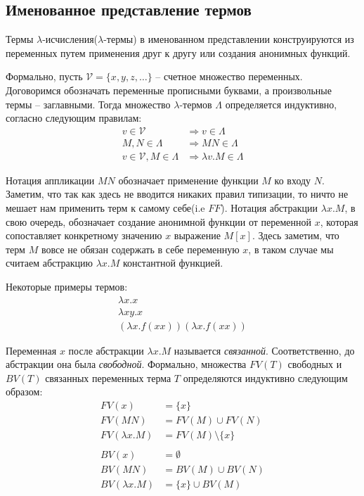 \subsection{Именованное представление термов}
\label{sec:named}

Термы $\lambda$-исчисления($\lambda$-термы) в именованном представлении конструируются из переменных путем применения друг к другу или создания анонимных функций.

Формально, пусть $\mathcal{V}=\{x,y,z,\dots\}$ -- счетное множество переменных. Договоримся обозначать переменные прописными буквами, а произвольные термы -- заглавными. Тогда множество $\lambda$-термов $\Lambda$ определяется индуктивно, согласно следующим правилам:
\begin{align*}
  v \in \mathcal{V} &\Rightarrow v \in \Lambda \\
  M, N \in \Lambda &\Rightarrow M N \in \Lambda \\
  v \in \mathcal{V}, M \in \Lambda &\Rightarrow \lambda v.M \in \Lambda
\end{align*}

Нотация аппликации $M N$ обозначает применение функции $M$ ко входу $N$. Заметим, что так как здесь не вводится никаких правил типизации, то ничто не мешает нам применить терм к самому себе(i.e $F F$). Нотация абстракции $\lambda x.M$, в свою очередь, обозначает создание анонимной функции от переменной $x$, которая сопоставляет конкретному значению $x$ выражение $M[x]$. Здесь заметим, что терм $M$ вовсе не обязан содержать в себе переменную $x$, в таком случае мы считаем абстракцию $\lambda x.M$ константной функцией.

Некоторые примеры термов:
\begin{gather*}
   \lambda x.x \\
   \lambda x y.x \\
   (\lambda x.f (x x)) (\lambda x.f (x x))
\end{gather*}

Переменная $x$ после абстракции $\lambda x.M$ называется \textit{связанной}. Соответственно, до абстракции она была \textit{свободной}. Формально, множества $FV(T)$ свободных и $BV(T)$ связанных переменных терма $T$ определяются индуктивно следующим образом:
\begin{align*}
  FV(x) &= \{x\} \\
  FV(M N) &= FV(M) \cup FV(N) \\
  FV(\lambda x. M) &= FV(M) \setminus \{x\} \\
  \\
  BV(x) &= \emptyset \\
  BV(M N) &= BV(M) \cup BV(N) \\
  BV(\lambda x. M) &= \{x\} \cup BV(M)
\end{align*}

